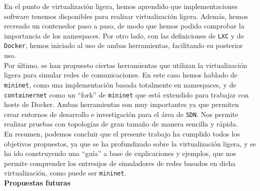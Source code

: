 \documentclass[a4paper, oneside, 12pt]{book}
\begin{document}
	\noindent En el punto de virtualización ligera, hemos aprendido que implementaciones software tenemos disponibles para realizar virtualización ligera. Además, hemos recreado un contenedor paso a paso, de modo que hemos podido comprobar la importancia de los namespaces. Por otro lado, con las definiciones de \texttt{LXC} y de \texttt{Docker}, hemos iniciado al uso de ambas herramientas, facilitando su posterior uso. \\
	
	\noindent Por último, se han propuesto ciertas herramientas que utilizan la virtualización ligera para simular redes de comunicaciones. En este caso hemos hablado de \texttt{mininet}, como una implementación basada totalmente en namespaces, y de \texttt{containernet} como un ``fork'' de \texttt{mininet} que está extendido para trabajar con hosts de Docker. Ambas herramientas son muy importantes ya que permiten crear entornos de desarrollo e investigación para el área de \texttt{SDN}. Nos permite realizar pruebas con topologías de gran tamaño de manera sencilla y rápida. \\
	
	\noindent En resumen, podemos concluir que el presente trabajo ha cumplido todos los objetivos propuestos, ya que se ha profundizado sobre la virtualización ligera, y se ha ido construyendo una ``guía'' a base de explicaciones y ejemplos, que nos permite comprender los entresijos de simuladores de redes basados en dicha virtualización, como puede ser \texttt{mininet}. \\
	
	
	\noindent \textbf{\large Propuestas futuras}\\
	
\end{document}
